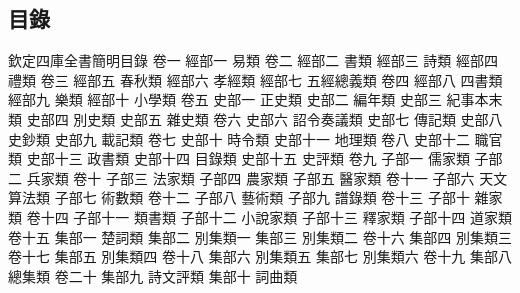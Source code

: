 \documentclass[四库全书文渊阁简明目录数字化]{ltc-guji-digital}
\begin{document}
\begin{正文}
\chapter{目錄}
欽定四庫全書簡明目錄
卷一
經部一
易類
卷二
經部二
書類
經部三
詩類
經部四
禮類
卷三
經部五
春秋類
經部六
孝經類
經部七
五經總義類
卷四
經部八
四書類
經部九
樂類
經部十
小學類
卷五
史部一
正史類
史部二
編年類
史部三
紀事本末類
史部四
別史類
史部五
雜史類
卷六
史部六
詔令奏議類
史部七
傳記類
史部八
史鈔類
史部九
載記類
卷七
史部十
時令類
史部十一
地理類
卷八
史部十二
職官類
史部十三
政書類
史部十四
目錄類
史部十五
史評類
卷九
子部一
儒家類
子部二
兵家類
卷十
子部三
法家類
子部四
農家類
子部五
醫家類
卷十一
子部六
天文算法類
子部七
術數類
卷十二
子部八
藝術類
子部九
譜錄類
卷十三
子部十
雜家類
卷十四
子部十一
類書類
子部十二
小說家類
子部十三
釋家類
子部十四
道家類
卷十五
集部一
楚詞類
集部二
別集類一
集部三
別集類二
卷十六
集部四
別集類三
卷十七
集部五
別集類四
卷十八
集部六
別集類五
集部七
別集類六
卷十九
集部八
總集類
卷二十
集部九
詩文評類
集部十
詞曲類

\end{正文}
\end{document}
